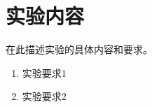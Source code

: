\section{实验内容}

在此描述实验的具体内容和要求。

\begin{enumerate}
    \item 实验要求1
    \item 实验要求2
\end{enumerate}

